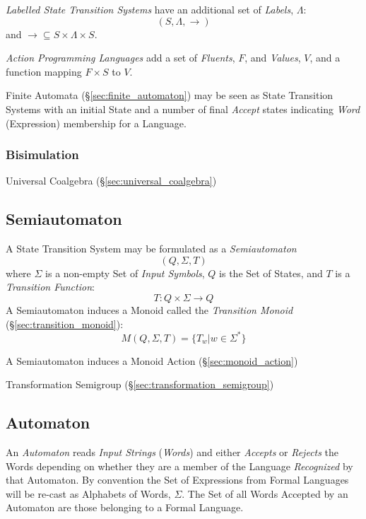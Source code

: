 \emph{Labelled State Transition Systems} have an additional set of
\emph{Labels}, $\Lambda$:
\[
  (S,\Lambda,\rightarrow)
\]
and $\rightarrow \subseteq S \times \Lambda \times S$.

\emph{Action Programming Languages} add a set of \emph{Fluents}, $F$, and
\emph{Values}, $V$, and a function mapping $F \times S$ to $V$.

Finite Automata (\S\ref{sec:finite_automaton}) may be seen as State
Transition Systems with an initial State and a number of final
\emph{Accept} states indicating \emph{Word} (Expression) membership
for a Language.



\subsubsection{Bisimulation} \label{sec:bisimulation}

Universal Coalgebra (\S\ref{sec:universal_coalgebra})



\subsection{Semiautomaton}\label{sec:semiautomaton}

A State Transition System may be formulated as a \emph{Semiautomaton}
\[
  (Q,\Sigma,T)
\]
where $\Sigma$ is a non-empty Set of \emph{Input Symbols}, $Q$ is the
Set of States, and $T$ is a \emph{Transition Function}:
\[
  T:Q \times \Sigma \rightarrow Q
\]
A Semiautomaton induces a Monoid called the \emph{Transition Monoid}
(\S\ref{sec:transition_monoid}):
\[
  M(Q,\Sigma,T) = \{T_w | w \in \Sigma^*\}
\]

A Semiautomaton induces a Monoid Action (\S\ref{sec:monoid_action})

Transformation Semigroup (\S\ref{sec:transformation_semigroup})




\subsection{Automaton} \label{sec:automaton}

An \emph{Automaton} reads \emph{Input Strings} (\emph{Words}) and
either \emph{Accepts} or \emph{Rejects} the Words depending on whether
they are a member of the Language \emph{Recognized} by that Automaton.
By convention the Set of Expressions from Formal Languages will be
re-cast as Alphabets of Words, $\Sigma$. The Set of all Words Accepted
by an Automaton are those belonging to a Formal Language.

